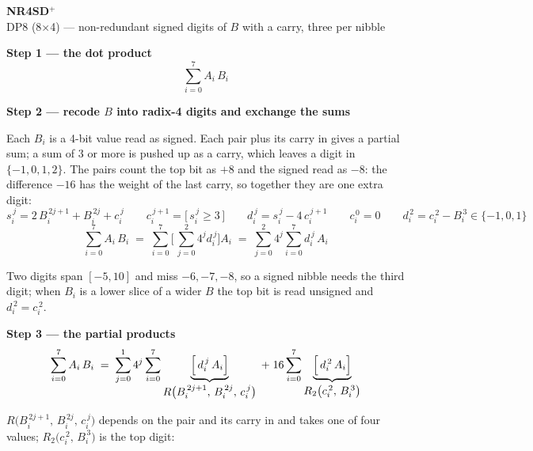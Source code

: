 \documentclass[fleqn]{article}
\newcommand{\Rp}{R\bigl(B_i^{\,2j+1},\, B_i^{\,2j},\, c_i^{\,j}\bigr)}
\newcommand{\Rt}{R_2\bigl(c_i^{\,2},\, B_i^{\,3}\bigr)}
\begin{document}
\begin{center}
{\LARGE \textbf{NR4SD$^{+}$}}\\[4pt]
{\large DP8 (8$\times$4) --- non-redundant signed digits of $B$ with a carry, three per nibble}
\end{center}

\vspace{1.5em}

\noindent\textbf{Step 1 --- the dot product}
\[
\sum_{i=0}^{7} A_i \, B_i
\]

\vspace{0.5em}

\noindent\textbf{Step 2 --- recode $B$ into radix-4 digits and exchange the sums}

\noindent Each $B_i$ is a 4-bit value read as signed. Each pair plus its carry in gives a
partial sum; a sum of $3$ or more is pushed up as a carry, which leaves a digit in
$\{-1, 0, 1, 2\}$. The pairs count the top bit as $+8$ and the signed read as $-8$: the
difference $-16$ has the weight of the last carry, so together they are one extra digit:
\[
s_i^{\,j} = 2\,B_i^{\,2j+1} + B_i^{\,2j} + c_i^{\,j}
\qquad
c_i^{\,j+1} = \bigl[\, s_i^{\,j} \geq 3 \,\bigr]
\qquad
d_i^{\,j} = s_i^{\,j} - 4\,c_i^{\,j+1}
\qquad
c_i^{\,0} = 0
\qquad
d_i^{\,2} = c_i^{\,2} - B_i^{\,3} \in \{-1, 0, 1\}
\]
\[
\sum_{i=0}^{7} A_i \, B_i
  \;=\; \sum_{i=0}^{7} \Biggl[\, \sum_{j=0}^{2} 4^{j} d_i^{\,j} \Biggr] A_i
  \;=\; \sum_{j=0}^{2} 4^{j} \sum_{i=0}^{7} d_i^{\,j} \, A_i
\]

\noindent Two digits span $[-5, 10]$ and miss $-6, -7, -8$, so a signed nibble needs the
third digit; when $B_i$ is a lower slice of a wider $B$ the top bit is read unsigned and
$d_i^{\,2} = c_i^{\,2}$.

\vspace{0.5em}

\noindent\textbf{Step 3 --- the partial products}
\[
\sum_{i=0}^{7} A_i \, B_i
  \;=\; \sum_{j=0}^{1} 4^{j} \sum_{i=0}^{7}
        \underbrace{\Bigl[\, d_i^{\,j} \, A_i \Bigr]}_{\textstyle \Rp}
  \;+\; 16 \sum_{i=0}^{7}
        \underbrace{\Bigl[\, d_i^{\,2} \, A_i \Bigr]}_{\textstyle \Rt}
\]

\noindent $\Rp$ depends on the pair and its carry in and takes one of four values;
$\Rt$ is the top digit:

\vspace{0.5em}
\end{document}
